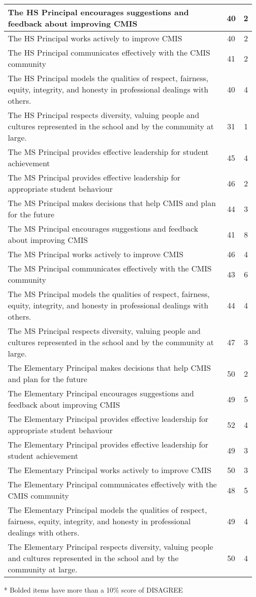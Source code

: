 {\begin{tabular}{|p{2in}|c|c|}
\hline
The HS Principal encourages suggestions and feedback about improving CMIS &
40 &
2 \\
\hline
The HS Principal works actively to improve CMIS &
40 &
2 \\
\hline
The HS Principal communicates effectively with the CMIS community &
41 &
2 \\
\hline
The HS Principal models the qualities of respect, fairness, equity, integrity, and honesty in professional dealings with others. &
40 &
4 \\
\hline
The HS Principal respects diversity, valuing people and cultures represented in the school and by the community at large. &
31 &
1 \\
\hline
The MS Principal provides effective leadership for student achievement &
45 &
4 \\
\hline
The MS Principal provides effective leadership for appropriate student behaviour &
46 &
2 \\
\hline
The MS Principal makes decisions that help CMIS and plan for the future &
44 &
3 \\
\hline
The MS Principal encourages suggestions and feedback about improving CMIS &
41 &
8 \\
\hline
The MS Principal works actively to improve CMIS &
46 &
4 \\
\hline
The MS Principal communicates effectively with the CMIS community &
43 &
6 \\
\hline
The MS Principal models the qualities of respect, fairness, equity, integrity, and honesty in professional dealings with others. &
44 &
4 \\
\hline
The MS Principal respects diversity, valuing people and cultures represented in the school and by the community at large. &
47 &
3 \\
\hline
The Elementary Principal makes decisions that help CMIS and plan for the future &
50 &
2 \\
\hline
The Elementary Principal encourages suggestions and feedback about improving CMIS &
49 &
5 \\
\hline
The Elementary Principal provides effective leadership for appropriate student behaviour &
52 &
4 \\
\hline
The Elementary Principal provides effective leadership for student achievement &
49 &
3 \\
\hline
The Elementary Principal works actively to improve CMIS &
50 &
3 \\
\hline
The Elementary Principal communicates effectively with the CMIS community &
48 &
5 \\
\hline
The Elementary Principal models the qualities of respect, fairness, equity, integrity, and honesty in professional dealings with others. &
49 &
4 \\
\hline
The Elementary Principal respects diversity, valuing people and cultures represented in the school and by the community at large. &
50 &
4 \\
\hline
\end{tabular}
* Bolded items have more than a 10\% score of DISAGREE

}
